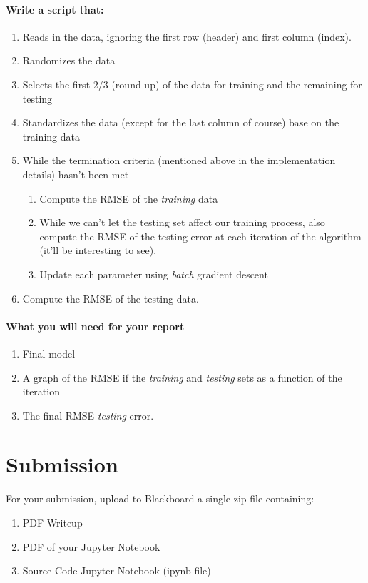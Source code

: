 \documentclass[12pt]{article}
\begin{document}
\paragraph{Write a script that:}
\begin{enumerate}
  \item Reads in the data, ignoring the first row (header) and first column (index).
  \item Randomizes the data
  \item Selects the first 2/3 (round up) of the data for training and the remaining for testing
  \item Standardizes the data (except for the last column of course) base on the training data
  \item While the termination criteria (mentioned above in the implementation details) hasn't been met
  \begin{enumerate}
  	\item Compute the RMSE of the \emph{training} data
  	\item While we can't let the testing set affect our training process, also compute the RMSE of the testing error at each iteration of the algorithm (it'll be interesting to see).
  	\item Update each parameter using \emph{batch} gradient descent
  \end{enumerate}
  \item Compute the RMSE of the testing data.
\end{enumerate}



\paragraph{What you will need for your report}
\begin{enumerate}
\item Final model
\item A graph of the RMSE if the \emph{training} and \emph{testing} sets as a function of the iteration
\item The final RMSE \emph{testing} error.
\end{enumerate}


\newpage
\section*{Submission}
For your submission, upload to Blackboard a single zip file containing:

\begin{enumerate}
\item PDF Writeup
\item PDF of your Jupyter Notebook
\item Source Code Jupyter Notebook (ipynb file)
\end{enumerate}
\end{document}
